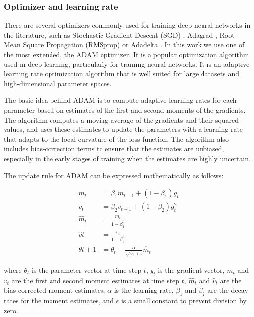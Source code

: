 \subsubsection{Optimizer and learning rate}
\label{subsubsec:3_optimizer_and_lr}

There are several optimizers commonly used for training deep neural networks in the literature, such as Stochastic Gradient Descent (SGD) \cite{robbins1951stochastic}, Adagrad \cite{duchi2011adaptive}, Root Mean Square Propagation (RMSprop) \cite{zou2019sufficient} or Adadelta \cite{zeiler2012adadelta}. In this work we use one of the most extended, the \ac{ADAM} \cite{kingma2014adam} optimizer. It is a popular optimization algorithm used in deep learning, particularly for training neural networks. It is an adaptive learning rate optimization algorithm that is well suited for large datasets and high-dimensional parameter spaces.

The basic idea behind ADAM is to compute adaptive learning rates for each parameter based on estimates of the first and second moments of the gradients. The algorithm computes a moving average of the gradients and their squared values, and uses these estimates to update the parameters with a learning rate that adapts to the local curvature of the loss function. The algorithm also includes bias-correction terms to ensure that the estimates are unbiased, especially in the early stages of training when the estimates are highly uncertain.

The update rule for ADAM can be expressed mathematically as follows:

\begin{equation}
\begin{split}
	m_t &= \beta_1 m_{t-1} + (1-\beta_1) g_t \\
	v_t &= \beta_2 v_{t-1} + (1-\beta_2) g_t^2 \\
	\hat{m}_t &= \frac{m_t}{1-\beta_1^t} \\
	\hat{v}t &= \frac{v_t}{1-\beta_2^t} \\
	\theta{t+1} &= \theta_t - \frac{\alpha}{\sqrt{\hat{v}_t}+\epsilon} \hat{m}_t
\end{split}
\end{equation}

where $\theta_t$ is the parameter vector at time step $t$, $g_t$ is the gradient vector, $m_t$ and $v_t$ are the first and second moment estimates at time step $t$, $\hat{m}_t$ and $\hat{v}_t$ are the bias-corrected moment estimates, $\alpha$ is the learning rate, $\beta_1$ and $\beta_2$ are the decay rates for the moment estimates, and $\epsilon$ is a small constant to prevent division by zero.

